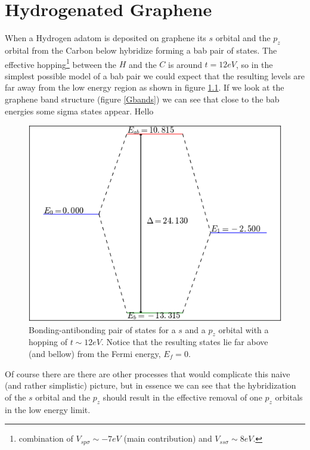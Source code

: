 \chapter{Hydrogenated Graphene}
When a Hydrogen adatom is deposited on graphene its $s$ orbital and the $p_z$ orbital from the Carbon below hybridize forming a \ac{bab} pair of states. The effective hopping\footnote{combination of $V_{sp\sigma}\sim -7eV$ (main contribution) and $V_{ss\sigma}\sim 8eV$.} between the $H$ and the $C$ is around $t=12eV$, so in the simplest possible model of a \ac{bab} pair we could expect that the resulting levels are far away from the low energy region as shown in figure \ref{bab}. If we look at the graphene band structure (figure \ref{Gbands}) we can see that close to the \ac{bab} energies some sigma states appear. Hello
\begin{figure}[h!]
\centering
\includegraphics{chapter05/figures/bonding_antibonding.png}
\caption{Bonding-antibonding pair of states for a $s$ and a $p_z$ orbital with a hopping of $t\sim 12eV$. Notice that the resulting states lie far above (and bellow) from the Fermi energy, $E_f=0$.}
\label{bab}
\end{figure}
\FloatBarrier
Of course there are there are other processes that would complicate this naive (and rather simplistic) picture, but in essence we can see that the hybridization of the $s$ orbital and the $p_z$ should result in the effective removal of one $p_z$ orbitals in the low energy limit.\\

